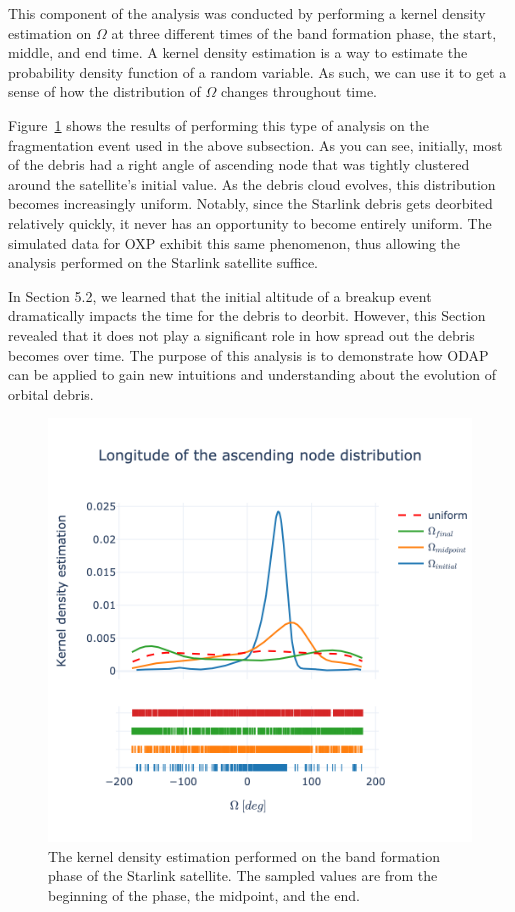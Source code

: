 \documentclass[a4paper, 12pt]{article}
\begin{document}
This component of the analysis was conducted by performing a kernel density estimation on $\Omega$ at three different times of the band formation phase, the start, middle, and end time. A kernel density estimation is a way to estimate the probability density function of a random variable. As such, we can use it to get a sense of how the distribution of $\Omega$ changes throughout time. 

Figure~\ref{fig:starlink_dist} shows the results of performing this type of analysis on the fragmentation event used in the above subsection. As you can see, initially, most of the debris had a right angle of ascending node that was tightly clustered around the satellite's initial value. As the debris cloud evolves, this distribution becomes increasingly uniform. Notably, since the Starlink debris gets deorbited relatively quickly, it never has an opportunity to become entirely uniform. The simulated data for OXP exhibit this same phenomenon, thus allowing the analysis performed on the Starlink satellite suffice.

In Section 5.2, we learned that the initial altitude of a breakup event dramatically impacts the time for the debris to deorbit. However, this Section revealed that it does not play a significant role in how spread out the debris becomes over time. The purpose of this analysis is to demonstrate how ODAP can be applied to gain new intuitions and understanding about the evolution of orbital debris.

\begin{figure}[h!]
	\centering
	\includegraphics[scale=0.4, trim={0 0 0 2cm},clip]{starlink_dist}
	\caption{The kernel density estimation performed on the band formation phase of the Starlink satellite. The sampled values are from the beginning of the phase, the midpoint, and the end.}
	\label{fig:starlink_dist}
\end{figure}
\end{document}
